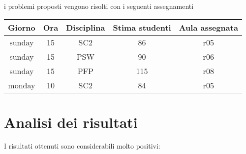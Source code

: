 \noindent
i problemi proposti vengono risolti con i seguenti assegnamenti

\begin{table}[h]
    \begin{small}
        \begin{center}
            \begin{tabular}[c]{c|c|c|c|c}
                Giorno & Ora & Disciplina & Stima studenti & Aula assegnata \\
                \hline
                sunday & 15 & SC2 & 86 & r05 \\
                sunday & 15 & PSW & 90 & r06 \\
                sunday & 15 & PFP & 115 & r08 \\
                monday & 10 & SC2 & 84 & r05
            \end{tabular}
        \end{center}
    \end{small}
\end{table}

\section{Analisi dei risultati}

I risultati ottenuti sono considerabili molto positivi:


